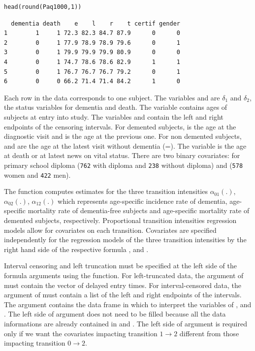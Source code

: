 \documentclass[article]{jss}
\begin{document}
\lstset{language=R,numbers=none}
\begin{lstlisting}
head(round(Paq1000,1))
\end{lstlisting}

\begin{verbatim}
  dementia death    e    l    r    t certif gender
1        1     1 72.3 82.3 84.7 87.9      0      0
2        0     1 77.9 78.9 78.9 79.6      0      1
3        0     1 79.9 79.9 79.9 80.9      0      0
4        0     1 74.7 78.6 78.6 82.9      1      1
5        0     1 76.7 76.7 76.7 79.2      0      1
6        0     0 66.2 71.4 71.4 84.2      1      0
\end{verbatim}

Each row in the data corresponds to one subject.  The variables
 and  are  \(\delta_1\) and \(\delta_2\), 
the status variables for dementia and death.
The variable  contains ages of subjects at entry into
study. The variables  and  contain the left and right
endpoints of the censoring intervals.  For demented subjects, 
is the age at the diagnostic visit and  is the age at the
previous one.  For non demented subjects,  and  are
the age at the latest visit without dementia (=).  The
variable  is the age at death or at latest news on vital
status.  There are two binary covariates:  for primary
school diploma (\texttt{762} with diploma and \texttt{238}
without diploma) and  (\texttt{578} women and
\texttt{422} men).

The function  computes estimates for the three transition
intensities \(\alpha_{01}(.)\), \(\alpha_{02}(.)\), \(\alpha_{12}(.)\) which
represents age-specific incidence rate of dementia, age-specific mortality
rate of dementia-free subjects and age-specific mortality rate of
demented subjects, respectively.  Proportional transition intensities
regression models allow for covariates on each transition.
Covariates are specified independently for the regression models of
the three transition intensities by the right hand side of the
respective formula ,  and
.

Interval censoring and left truncation must be specified at the left
side of the formula arguments using the  function.  For
left-truncated data, the  argument of  must
contain the vector of delayed entry times.  For interval-censored
data, the  argument of  must contain a list of
the left and right endpoints of the intervals.
The  argument contains the data frame in which to
interpret the variables of ,  and
.
The left side of  argument does not need to be filled because all the data 
informations are already contained in  and .
The left side of  argument is required only if we want the covariates 
impacting 
transition \(1 \rightarrow 2\) different from those impacting transition 
\(0 \rightarrow 2\).
\end{document}
